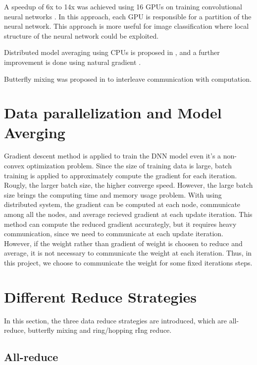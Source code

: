 \documentclass{article}
\begin{document}
A speedup of 6x to 14x was achieved using 16 GPUs on training convolutional neural networks \cite{coates2013deep}. In this approach,
each GPU is responsible for a partition of the neural network. This approach is more useful for image classification where 
local structure of the neural network could be exploited.

Distributed model averaging using CPUs is proposed in \cite{zhang2014improving},
and a further improvement is done using natural gradient \cite{povey2014parallel}.


Butterfly mixing was proposed in \cite{zhao2013butterfly} to interleave communication with computation.


\section{Data parallelization and Model Averging}
Gradient descent method is applied to train the DNN model even it's a non-convex optimization problem. Since the size of training data is large, batch training is applied to approximately compute the gradient for each iteration. Rougly, the larger batch size, the higher converge speed. However, the large batch size brings the computing time and memory usage problem. With using distributed system, the gradient can be computed at each node, communicate among all the nodes, and average recieved gradient at each update iteration. This method can compute the reduced gradient accurategly, but it requires heavy communication, since we need to communicate at each update iteration. \\

However, if the weight rather than gradient of weight is choosen to reduce and average, it is not necessary to communicate the weight at each iteration. Thus, in this project, we choose to communicate the weight for some fixed iterations steps. 
\section{Different Reduce Strategies}
In this section, the three data reduce strategies are introduced, which are all-reduce, butterfly mixing and ring/hopping rIng reduce.

\subsection{All-reduce}
\end{document}
